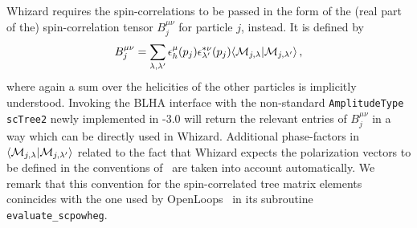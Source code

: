 Whizard requires the spin-correlations to be passed in the form of the (real  part of the) spin-correlation tensor $B_j^{\mu\nu}$ for particle $j$, instead. It is defined by
\begin{equation}
   B_j^{\mu\nu} = \sum_{\lambda,\lambda'}\epsilon_h^\mu(p_j)\epsilon_{\lambda'}^{*\nu}(p_j)\langle {\cal M}_{j,\lambda}|{\cal M}_{j,\lambda'}\rangle\,,
\end{equation}
where again a sum over the helicities of the other particles is implicitly understood. Invoking the BLHA interface with the non-standard \texttt{AmplitudeType scTree2} newly implemented in \gosam{}-3.0 will return the relevant entries of $B_j^{\mu\nu}$ in a way which can be directly used in Whizard. Additional phase-factors in $\langle {\cal M}_{j,\lambda}|{\cal M}_{j,\lambda'}\rangle$ related to the fact that Whizard expects the polarization vectors to be defined in the conventions of~\cite{Murayama:1992gi} are taken into account automatically. We remark that this convention for the spin-correlated tree matrix elements conincides with the one used by OpenLoops~\cite{Buccioni:2019sur} in its subroutine \texttt{evaluate\_scpowheg}.
